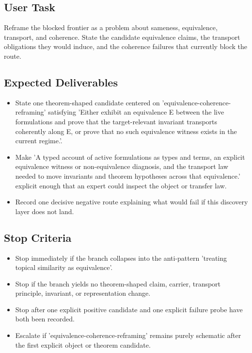 \documentclass[11pt]{article}
\begin{document}
\subsection*{User Task}
Reframe the blocked frontier as a problem about sameness, equivalence, transport, and coherence. State the candidate equivalence claims, the transport obligations they would induce, and the coherence failures that currently block the route.

\subsection*{Expected Deliverables}
\begin{itemize}[leftmargin=*,itemsep=0.2em]
\item State one theorem-shaped candidate centered on 'equivalence-coherence-reframing' satisfying 'Either exhibit an equivalence E between the live formulations and prove that the target-relevant invariant transports coherently along E, or prove that no such equivalence witness exists in the current regime.'.
\item Make 'A typed account of active formulations as types and terms, an explicit equivalence witness or non-equivalence diagnosis, and the transport law needed to move invariants and theorem hypotheses across that equivalence.' explicit enough that an expert could inspect the object or transfer law.
\item Record one decisive negative route explaining what would fail if this discovery layer does not land.
\end{itemize}
\subsection*{Stop Criteria}
\begin{itemize}[leftmargin=*,itemsep=0.2em]
\item Stop immediately if the branch collapses into the anti-pattern 'treating topical similarity as equivalence'.
\item Stop if the branch yields no theorem-shaped claim, carrier, transport principle, invariant, or representation change.
\item Stop after one explicit positive candidate and one explicit failure probe have both been recorded.
\item Escalate if 'equivalence-coherence-reframing' remains purely schematic after the first explicit object or theorem candidate.
\end{itemize}
\end{document}
